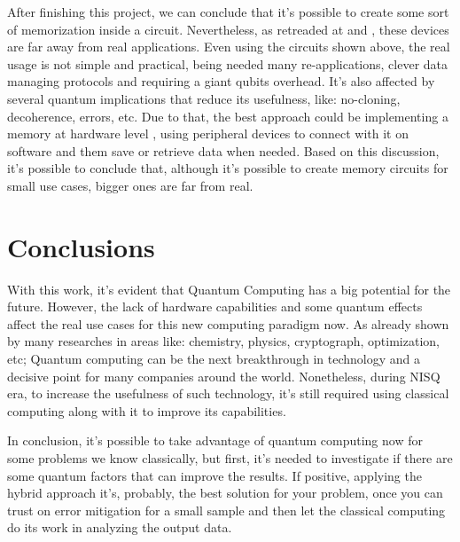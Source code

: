 \documentclass[sn-mathphys-num]{sn-jnl}
\begin{document}
After finishing this project, we can conclude that it's possible to create some sort of memorization inside a circuit. Nevertheless, as retreaded at \cite{jaques2023qram} and \cite{Giovannetti_2008}, these devices are far away from real applications. Even using the circuits shown above, the real usage is not simple and practical, being needed many re-applications, clever data managing protocols and requiring a giant qubits overhead. It's also affected by several quantum implications that reduce its usefulness, like: no-cloning, decoherence, errors, etc.
Due to that, the best approach could be implementing a memory at hardware level \cite{jaques2023qram}, using peripheral devices to connect with it on software and them save or retrieve data when needed.
Based on this discussion, it's possible to conclude that, although it's possible to create memory circuits for small use cases, bigger ones are far from real.


\section{Conclusions}\label{conclusions}

With this work, it's evident that Quantum Computing has a big potential for the future. However, the lack of hardware capabilities and some quantum effects affect the real use cases for this new computing paradigm now.
As already shown by many researches in areas like: chemistry, physics, cryptograph, optimization, etc; Quantum computing can be the next breakthrough in technology and a decisive point for many companies around the world.
Nonetheless, during NISQ era, to increase the usefulness of such technology, it's still required using classical computing along with it to improve its capabilities. 

In conclusion, it's possible to take advantage of quantum computing now for some problems we know classically, but first, it's needed to investigate if there are some quantum factors that can improve the results. If positive, applying the hybrid approach it's, probably, the best solution for your problem, once you can trust on error mitigation for a small sample and then let the classical computing do its work in analyzing the output data.


\end{document}
